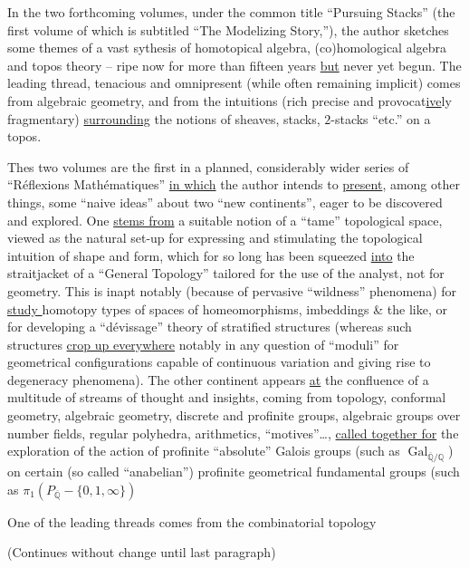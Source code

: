 In the two forthcoming volumes, under the common title ``Pursuing Stacks'' (the first volume of which is subtitled ``The Modelizing Story,''), the author sketches some themes of a vast sythesis of homotopical algebra, (co)homological algebra and topos theory -- ripe now for more than fifteen years \uline{but} never yet begun. The leading thread, tenacious and omnipresent (while often remaining implicit) comes from algebraic geometry, and from the intuitions (rich precise and provocat\uline{ive}ly fragmentary) \uline{surrounding} the notions of sheaves, stacks, $2$-stacks ``etc.'' on a topos.

Thes two volumes are the first in a planned, considerably wider series of ``Réflexions Mathématiques'' \uline{in which} the author intends to \uline{present}, among other things, some ``naive ideas'' about two ``new continents'', eager to be discovered and explored. One \uline{stems from}
a suitable notion of a ``tame'' topological space, viewed as the natural set-up for expressing and stimulating the topological intuition of shape and form, which for so long has been squeezed \uline{into} the straitjacket of a ``General Topology'' tailored for the use of the analyst, not for geometry. This is inapt notably (because of pervasive ``wildness'' phenomena) for \uline{ study } homotopy types of spaces of homeomorphisms, imbeddings \& the like, or for developing a  ``dévissage'' theory of stratified structures (whereas such structures  \uline{crop up everywhere} notably in any question of ``moduli'' for geometrical configurations capable of continuous variation and giving rise to degeneracy phenomena). The other continent appears \uline{at} the confluence of a multitude of streams of thought and insights, coming from topology, conformal geometry, algebraic geometry, discrete and profinite groups, algebraic groups over number fields, regular polyhedra, arithmetics, ``motives''\ldots, \uline{called together for} the exploration of the action of profinite ``absolute'' Galois groups (such as $\operatorname{Gal}_{\overline{\mathbb{Q}}/\mathbb{Q}}$) on certain (so called ``anabelian'') profinite geometrical fundamental groups (such as $\pi_{1}(P_{\overline{\mathbb{Q}}}-\{0,1,\infty\})$

One of the leading threads comes from the combinatorial topology

(Continues without change until last paragraph)

